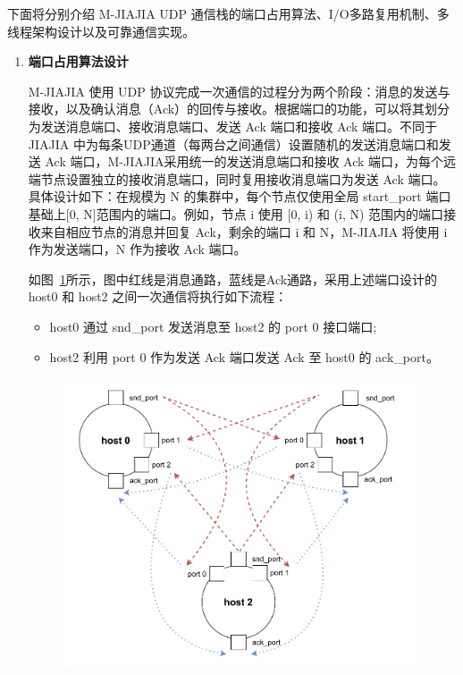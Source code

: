 {    下面将分别介绍 M-JIAJIA UDP 通信栈的端口占用算法、I/O多路复用机制、多线程架构设计以及可靠通信实现。
    \begin{enumerate}[label=\arabic*.]
        \item \textbf{端口占用算法设计}

              M-JIAJIA 使用 UDP 协议完成一次通信的过程分为两个阶段：消息的发送与接收，以及确认消息（Ack）的回传与接收。根据端口的功能，可以将其划分为发送消息端口、接收消息端口、发送 Ack 端口和接收 Ack 端口。不同于 JIAJIA 中为每条UDP通道（每两台之间通信）设置随机的发送消息端口和发送 Ack 端口，M-JIAJIA采用统一的发送消息端口和接收 Ack 端口，为每个远端节点设置独立的接收消息端口，同时复用接收消息端口为发送 Ack 端口。具体设计如下：在规模为 N 的集群中，每个节点仅使用全局 start\_port 端口基础上[0, N]范围内的端口。例如，节点 i 使用 [0, i) 和 (i, N) 范围内的端口接收来自相应节点的消息并回复 Ack，剩余的端口 i 和 N，M-JIAJIA 将使用 i 作为发送端口，N 作为接收 Ack 端口。

              如图~\ref{fig:mjiajia-port-design}所示，图中红线是消息通路，蓝线是Ack通路，采用上述端口设计的host0 和 host2 之间一次通信将执行如下流程：
              \begin{itemize}
                  \item host0 通过 snd\_port 发送消息至 host2 的 port 0 接口端口;
                  \item host2 利用 port 0 作为发送 Ack 端口发送 Ack 至 host0 的 ack\_port。
              \end{itemize}

              \begin{figure}[H]
                  \centering
                  \includegraphics[width=1.0\textwidth]{Img/comm_port.drawio.pdf}
                  \label{fig:mjiajia-port-design}
              \end{figure}


\end{enumerate}}
